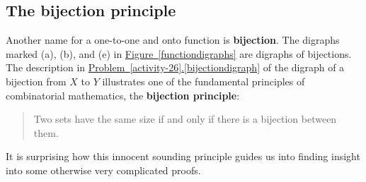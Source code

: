 \documentclass[10pt,]{book}
\newcommand{\terminology}[1]{\textbf{#1}}
\theoremstyle{plain}
\theoremstyle{definition}
\theoremstyle{definition}
\numberwithin{equation}{chapter}
\begin{document}
\subsection[{The bijection principle}]{The bijection principle}\label{subsection-3}
Another name for a one-to-one and onto function is \terminology{bijection}. The digraphs marked (a), (b), and (e) in \hyperref[functiondigraphs]{Figure~\ref{functiondigraphs}} are digraphs of bijections. The description in \hyperref[bijectiondigraph]{Problem~\ref{activity-26}.\ref{bijectiondigraph}} of the digraph of a bijection from \(X\) to \(Y\) illustrates one of the fundamental principles of combinatorial mathematics, the \terminology{bijection principle}:%
\begin{quote}\hypertarget{blockquote-3}{}
Two sets have the same size if and only if there is a bijection between them.%
\end{quote}
It is surprising how this innocent sounding principle guides us into finding insight into some otherwise very complicated proofs.%
\typeout{************************************************}
\typeout{************************************************}
\end{document}
